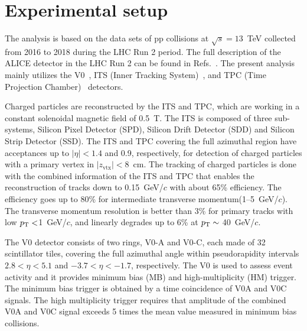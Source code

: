 

\section{Experimental setup}
\label{sec:experiment}

The analysis is based on the data sets of pp collisions at $\sqrt{s} = 13$~TeV collected from 2016 to 2018 during the LHC Run 2 period. The full description of the ALICE detector in the LHC Run 2 can be found in Refs.~\cite{Aamodt:2008zz,Abelev:2014ffa}. The present analysis mainly utilizes the V0~\cite{Abbas:2013taa}, ITS (Inner Tracking System)~\cite{aliceITS}, and TPC (Time Projection Chamber)~\cite{aliceTPC} detectors.

Charged particles are reconstructed by the ITS and TPC, which are working in a constant solenoidal magnetic field of 0.5~T. The ITS is composed of three sub-systems, Silicon Pixel Detector (SPD), Silicon Drift Detector (SDD) and Silicon Strip Detector (SSD). The ITS and TPC covering the full azimuthal region have acceptances up to $|\eta| < 1.4$ and 0.9, respectively, for detection of charged particles with a primary vertex in $|z_\mathrm{vtx}| < 8$~cm. The tracking of charged particles is done with the combined information of the ITS and TPC that enables the reconstruction of tracks down to 0.15~GeV/$c$ with about 65\% efficiency. The efficiency goes up to 80\% for intermediate transverse momentum(1--5~GeV/$c$). The transverse momentum resolution is better than 3\% for primary tracks with low $p_\mathrm{T}<$1~GeV/$c$, and linearly degrades up to 6\% at $p_\mathrm{T} \sim$ 40~GeV/$c$.

The V0 detector consists of two rings, V0-A and V0-C, each made of 32 scintillator tiles, covering the full azimuthal angle within pseudorapidity intervals $2.8 < \eta < 5.1$ and $-3.7 < \eta < -1.7$, respectively. 
The V0 is used to assess event activity and it provides minimum bias (MB) and high-multiplicity (HM) trigger. The minimum bias trigger is obtained by a time coincidence of V0A and V0C signals. The high multiplicity trigger requires that amplitude of the combined V0A and V0C signal exceeds 5 times the mean value measured in minimum bias collisions.

